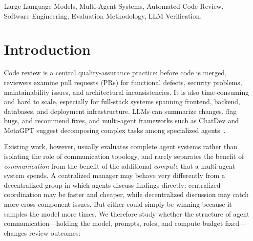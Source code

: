 \documentclass[conference]{IEEEtran}
\begin{document}
\begin{abstract}
cross-family companion (Kimi K2.5, GLM~5). The primary specialization
hypothesis is null---at matched compute, role specialists tie plain
samples on recall ($p{=}0.73$)---and no multi-agent arm approaches the
single-pass baseline on F1 (0.36--0.38 vs.\ 0.49, Holm $p{<}0.001$):
extra homogeneous agents buy recall (0.63 vs.\ 0.50) but drown it in
false positives at 3--9$\times$ the cost, and the self-consistency rescue
our pilot suggested does not replicate. The verification axis is
different: findings corroborated by ${\geq}2$ independent model families
reach precision 0.72 vs.\ 0.54 single-arm at equal-or-higher F1, and
findings all three families agree on are real 89\% of the time vs.\ 54\%
for one model repeating itself across three runs (gap CI $[0.29, 0.41]$;
judge-invariant, $\kappa{=}0.95$ across two independent pair judges). In
multi-agent code review, diversity pays on the verification axis, not the
generation axis.
\end{abstract}

\begin{IEEEkeywords}
Large Language Models, Multi-Agent Systems, Automated Code Review, Software
Engineering, Evaluation Methodology, LLM Verification.
\end{IEEEkeywords}

\section{Introduction}

Code review is a central quality-assurance practice: before code is merged,
reviewers examine pull requests (PRs) for functional defects, security
problems, maintainability issues, and architectural inconsistencies. It is
also time-consuming and hard to scale, especially for full-stack systems
spanning frontend, backend, databases, and deployment infrastructure. LLMs
can summarize changes, flag bugs, and recommend fixes, and multi-agent
frameworks such as ChatDev and MetaGPT suggest decomposing complex tasks
among specialized agents~\cite{chatdev,metagpt}.

Existing work, however, usually evaluates complete agent systems rather than
isolating the role of communication topology, and rarely separates the
benefit of \emph{communication} from the benefit of the additional
\emph{compute} that a multi-agent system spends. A centralized manager may
behave very differently from a decentralized group in which agents discuss
findings directly: centralized coordination may be faster and cheaper, while
decentralized discussion may catch more cross-component issues. But either
could simply be winning because it samples the model more times. We
therefore study whether the structure of agent communication---holding the
model, prompts, roles, and compute budget fixed---changes review outcomes:
\end{document}
